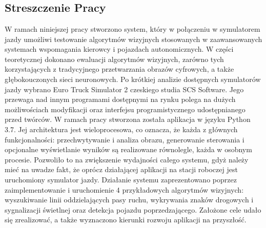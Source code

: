 \chapter*{ }
\section*{Streszczenie Pracy}


W ramach niniejszej pracy stworzono system, który w połączeniu w symulatorem jazdy umożliwi testowanie algorytmów wizyjnych stosowanych w zaawansowanych systemach wspomagania kierowcy i pojazdach autonomicznych.
W części teoretycznej dokonano ewaluacji algorytmów wizyjnych, zarówno tych korzystających z tradycyjnego przetwarzania obrazów cyfrowych, a także głębokouczonych sieci neuronowych.
Po krótkiej analizie dostępnych symulatorów jazdy wybrano Euro Truck Simulator 2 czeskiego studia SCS Software.
Jego przewaga nad innym programami dostępnymi na rynku polega na dużych możliwościach modyfikacji oraz interfejsu programistycznego udostępnianego przed twórców.
W ramach pracy stworzona została aplikacja w języku Python 3.7.
Jej architektura jest wieloprocesowa, co oznacza, że każda z głównych funkcjonalności: przechwytywanie i analiza obrazu, generowanie 
sterowania i opcjonalne wyświetlanie wyników są realizowane równolegle, każda w osobnym procesie.
Pozwoliło to na zwiększenie wydajności całego systemu, gdyż należy mieć na uwadze fakt, że oprócz działającej aplikacji na stacji roboczej jest uruchomiony symulator jazdy.
Działanie systemu zaprezentowano poprzez zaimplementowanie i uruchomienie 4 przykładowych algorytmów wizyjnych: wyszukiwanie linii oddzielających pasy ruchu, wykrywania znaków drogowych i sygnalizacji świetlnej oraz detekcja pojazdu poprzedzającego.%
Założone cele udało się zrealizować, a także wyznaczono kierunki rozwoju aplikacji na przyszłość.

